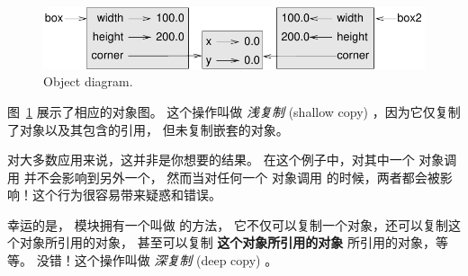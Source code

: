 \begin{figure}
\centerline
{\includegraphics[scale=0.8]{../source/figs/rectangle2.pdf}}
\caption{Object diagram.}
\label{fig.rectangle2}
\end{figure}


图~\ref{fig.rectangle2} 展示了相应的对象图。 这个操作叫做 {\em 浅复制} (shallow
copy) ，因为它仅复制了对象以及其包含的引用， 但未复制嵌套的对象。
  
  
  


对大多数应用来说，这并非是你想要的结果。
在这个例子中，对其中一个  对象调用 并不会影响到另外一个， 然而当对任何一个  对象调用 的时候，两者都会被影响！这个行为很容易带来疑惑和错误。
  


幸运的是，  模块拥有一个叫做  的方法，
它不仅可以复制一个对象，还可以复制这个对象所引用的对象，
甚至可以复制 {\bf 这个对象所引用的对象} 所引用的对象，等等。
没错！这个操作叫做 {\em 深复制} (deep copy) 。

  

